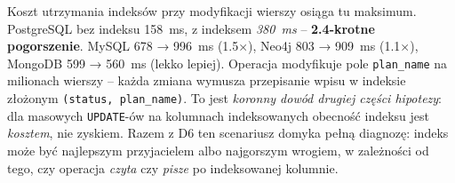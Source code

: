 Koszt utrzymania indeksów przy modyfikacji wierszy osiąga tu
maksimum. PostgreSQL bez indeksu
158~ms, z indeksem \emph{380~ms} -- \textbf{2.4-krotne pogorszenie}.
MySQL 678 → 996~ms (1.5×), Neo4j 803 → 909~ms (1.1×), MongoDB
599 → 560~ms (lekko lepiej). Operacja modyfikuje pole \texttt{plan\_name}
na milionach wierszy -- każda zmiana wymusza przepisanie wpisu
w indeksie złożonym \texttt{(status, plan\_name)}. To jest
\emph{koronny dowód drugiej części hipotezy}: dla masowych
\texttt{UPDATE}-ów na kolumnach indeksowanych obecność indeksu
jest \emph{kosztem}, nie zyskiem. Razem z D6 ten scenariusz
domyka pełną diagnozę: indeks może być najlepszym przyjacielem
albo najgorszym wrogiem, w zależności od tego, czy operacja
\emph{czyta} czy \emph{pisze} po indeksowanej kolumnie.
